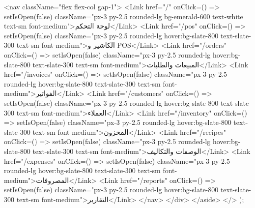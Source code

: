 {          <nav className="flex flex-col gap-1">
            <Link href="/" onClick={() => setIsOpen(false)} className="px-3 py-2.5 rounded-lg bg-emerald-600 text-white text-sm font-medium">لوحة التحكم</Link>
            <Link href="/pos" onClick={() => setIsOpen(false)} className="px-3 py-2.5 rounded-lg hover:bg-slate-800 text-slate-300 text-sm font-medium">الكاشير و POS</Link>
            <Link href="/orders" onClick={() => setIsOpen(false)} className="px-3 py-2.5 rounded-lg hover:bg-slate-800 text-slate-300 text-sm font-medium">المبيعات والطلبات</Link>
            <Link href="/invoices" onClick={() => setIsOpen(false)} className="px-3 py-2.5 rounded-lg hover:bg-slate-800 text-slate-300 text-sm font-medium">الفواتير</Link>
            <Link href="/customers" onClick={() => setIsOpen(false)} className="px-3 py-2.5 rounded-lg hover:bg-slate-800 text-slate-300 text-sm font-medium">العملاء</Link>
            <Link href="/inventory" onClick={() => setIsOpen(false)} className="px-3 py-2.5 rounded-lg hover:bg-slate-800 text-slate-300 text-sm font-medium">المخزون</Link>
            <Link href="/recipes" onClick={() => setIsOpen(false)} className="px-3 py-2.5 rounded-lg hover:bg-slate-800 text-slate-300 text-sm font-medium">الوصفات والتكاليف</Link>
            <Link href="/expenses" onClick={() => setIsOpen(false)} className="px-3 py-2.5 rounded-lg hover:bg-slate-800 text-slate-300 text-sm font-medium">المصروفات</Link>
            <Link href="/reports" onClick={() => setIsOpen(false)} className="px-3 py-2.5 rounded-lg hover:bg-slate-800 text-slate-300 text-sm font-medium">التقارير</Link>
          </nav>
        </div>
      </aside>
    </>
  );
}